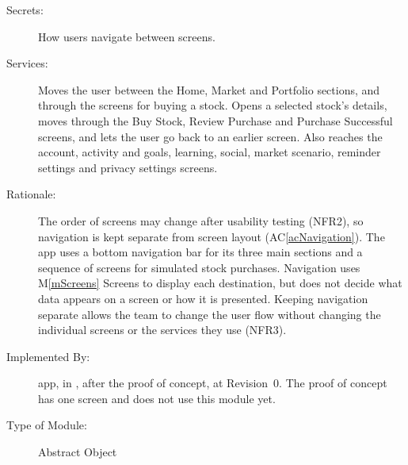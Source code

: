\documentclass[12pt, titlepage]{article}
\newcommand{\acref}[1]{AC\ref{#1}}
\newcommand{\mref}[1]{M\ref{#1}}
\begin{document}
\begin{description}
\item[Secrets:] How users navigate between screens.
\item[Services:] Moves the user between the Home, Market and Portfolio sections, and through the screens for buying a stock. Opens a selected stock's details, moves through the Buy Stock, Review Purchase and Purchase Successful screens, and lets the user go back to an earlier screen. Also reaches the account, activity and goals, learning, social, market scenario, reminder settings and privacy settings screens.
\item[Rationale:] The order of screens may change after usability testing (NFR2), so navigation is kept separate from screen layout (\acref{acNavigation}). The app uses a bottom navigation bar for its three main sections and a sequence of screens for simulated stock purchases. Navigation uses \mref{mScreens} Screens to display each destination, but does not decide what data appears on a screen or how it is presented. Keeping navigation separate allows the team to change the user flow without changing the individual screens or the services they use (NFR3).
\item[Implemented By:] \progname{} app, in , after the proof of concept, at Revision~0. The proof of concept has one screen and does not use this module yet.
\item[Type of Module:] Abstract Object
\end{description}
\end{document}
